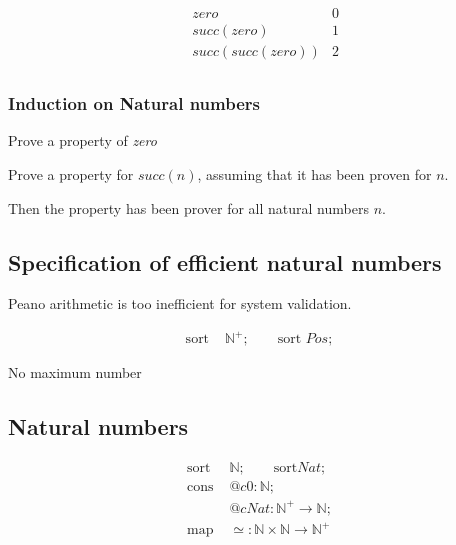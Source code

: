 \begin{align*}
  & zero & 0 \\
  & succ(zero) & 1 \\
  & succ(succ(zero)) & 2 \\
\end{align*}

\subsubsection{Induction on Natural numbers}
Prove a property of \emph{zero}

Prove a property for $succ(n)$, assuming that it has been proven for $n$.

Then the property has been prover for all natural numbers $n$.

\subsection{Specification of efficient natural numbers}

Peano arithmetic is too inefficient for system validation.

\begin{align*}
  \text{sort } & \mathbb{N}^+; \qquad \text{sort } Pos;
\end{align*}

No maximum number

\subsection{Natural numbers}

\begin{align*}
  \text{sort } & \mathbb{N}; \qquad \text{sort} Nat; \\
  \text{cons } & @c0: \mathbb{N}; \\
  & @cNat: \mathbb{N}^+ \rightarrow \mathbb{N}; \\
  \text{map } & \simeq: \mathbb{N} \times \mathbb{N} \rightarrow \mathbb{N}^+
\end{align*}







